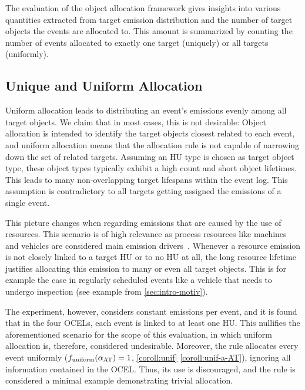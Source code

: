 
The evaluation of the object allocation framework gives insights into various quantities extracted from target emission distribution and the number of target objects the events are allocated to. This amount is summarized by counting the number of events allocated to exactly one target (uniquely) or all targets (uniformly).

\subsection*{Unique and Uniform Allocation}

Uniform allocation leads to distributing an event's emissions evenly among all target objects. We claim that in most cases, this is not desirable:
Object allocation is intended to identify the target objects closest related to each event, and uniform allocation means that the allocation rule is not capable of narrowing down the set of related targets.
Assuming an HU type is chosen as target object type, these object types typically exhibit a high count and short object lifetimes. This leads to many non-overlapping target lifespans within the event log. This assumption is contradictory to all targets getting assigned the emissions of a single event.

This picture changes when regarding emissions that are caused by the use of resources. This scenario is of high relevance as process resources like machines and vehicles are considered main emission drivers~\cite{Graves23rethink}.
Whenever a resource emission is not closely linked to a target HU or to no HU at all, the long resource lifetime justifies allocating this emission to many or even all target objects. This is for example the case in regularly scheduled events like a vehicle that needs to undergo inspection (see example from \autoref{sec:intro-motiv}).

The experiment, however, considers constant emissions per event, and it is found that in the four OCELs, each event is linked to at least one HU.
This nullifies the aforementioned scenario for the scope of this evaluation, in which uniform allocation is, therefore, considered undesirable.
Moreover, the  rule allocates every event uniformly ($f_{\text{uniform}}(\alpha_\text{AT})=1$, \cref{coroll:unif} \ref{coroll:unif-a-AT}), ignoring all information contained in the OCEL.
Thus, its use is discouraged, and the rule is considered a minimal example demonstrating trivial allocation.

